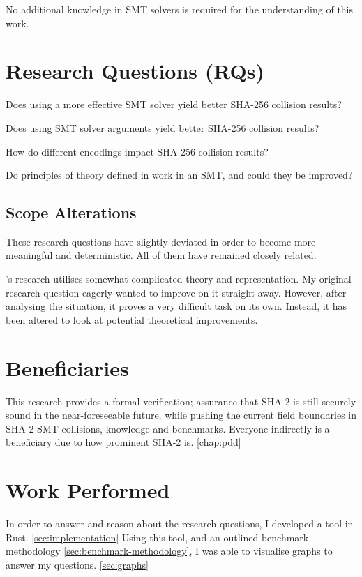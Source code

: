 \documentclass[a4paper]{report}
\begin{document}
No additional knowledge in SMT solvers is required for the understanding of this work.

\section{Research Questions (RQs)}
\begin{researchquestions}
  \item \label{rq1} Does using a more effective SMT solver yield better SHA-256 collision results?
  \item \label{rq2} Does using SMT solver arguments yield better SHA-256 collision results?
	\item \label{rq3} How do different encodings impact SHA-256 collision results?
	\item \label{rq4} Do principles of theory defined in \cite{li_2024} work in an SMT, and could they be improved?
\end{researchquestions}

\subsection{Scope Alterations}
These research questions have slightly deviated in order to become more meaningful and deterministic.
All of them have remained closely related.

\cite{li_2024}'s research utilises somewhat complicated theory and representation.
My original research question eagerly wanted to improve on it straight away.
However, after analysing the situation, it proves a very difficult task on its own.
Instead, it has been altered to look at potential theoretical improvements.

\section{Beneficiaries}
This research provides a formal verification; assurance that SHA-2 is still securely
sound in the near-foreseeable future, while pushing the current field boundaries in
SHA-2 SMT collisions, knowledge and benchmarks.
Everyone indirectly is a beneficiary due to how prominent SHA-2 is.
\ref{chap:pdd}

\section{Work Performed}
In order to answer and reason about the research questions, I developed a tool in Rust. \ref{sec:implementation}
Using this tool, and an outlined benchmark methodology \ref{sec:benchmark-methodology}, I was able to visualise graphs to answer my questions. \ref{sec:graphs}
\end{document}
